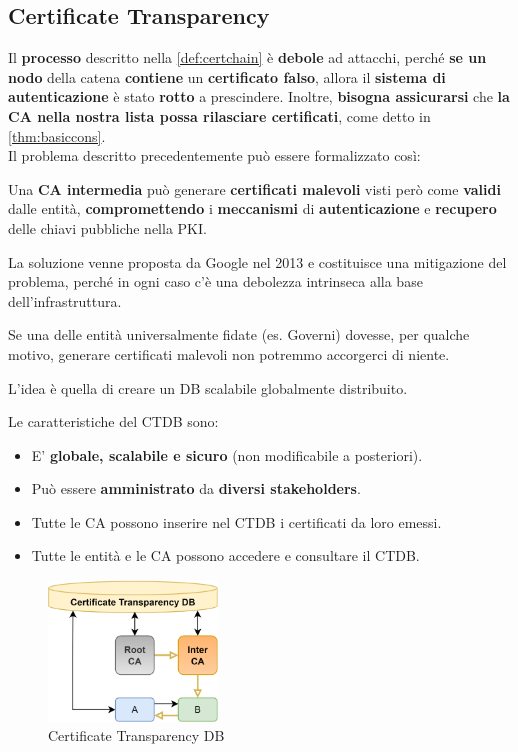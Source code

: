 \subsection{Certificate Transparency}
Il \textbf{processo} descritto nella \cref{def:certchain} è \textbf{debole} ad attacchi, perché \textbf{se un nodo} della catena \textbf{contiene} un \textbf{certificato falso}, allora il \textbf{sistema di autenticazione} è stato \textbf{rotto} a prescindere. Inoltre, \textbf{bisogna assicurarsi} che \textbf{la CA nella nostra lista possa rilasciare certificati}, come detto in \cref{thm:basiccons}.\\
Il problema descritto precedentemente può essere formalizzato così:
\begin{definition}
Una \textbf{CA intermedia} può generare \textbf{certificati malevoli} visti però come \textbf{validi} dalle entità, \textbf{compromettendo} i \textbf{meccanismi} di \textbf{autenticazione} e \textbf{recupero} delle chiavi pubbliche nella PKI.
\end{definition}
La soluzione venne proposta da Google nel 2013 e costituisce una mitigazione del problema, perché in ogni caso c'è una debolezza intrinseca alla base dell'infrastruttura.
\begin{remark}
Se una delle entità universalmente fidate (es. Governi) dovesse, per qualche motivo, generare certificati malevoli non potremmo accorgerci di niente.
\end{remark}
L'idea è quella di creare un DB scalabile globalmente distribuito.
\begin{multicols}{2}
\begin{definition}[CTDB]
Le caratteristiche del CTDB sono:
\begin{itemize}
    \item E' \textbf{globale, scalabile e sicuro} (non modificabile a posteriori).
    \item Può essere \textbf{amministrato} da \textbf{diversi stakeholders}.
    \item Tutte le CA possono inserire nel CTDB i certificati da loro emessi.
    \item Tutte le entità e le CA possono accedere e consultare il CTDB.
\end{itemize}
\end{definition}

\columnbreak
\begin{figure}[H]
    \centering
    \includegraphics[width=0.4\textwidth]{image/certtrans.png}
    \caption{Certificate Transparency DB}
    \label{fig:certrans}
\end{figure}
\end{multicols}

